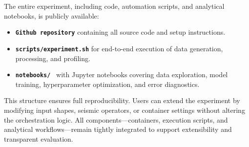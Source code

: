 
The entire experiment, including code, automation scripts, and analytical notebooks, is publicly available:
\begin{itemize}
    \item \textbf{\texttt{Github repository}}\cite{delucca2025experiment2} containing all source code and setup instructions.
    \item \textbf{\texttt{scripts/experiment.sh}}\cite{delucca2025experiment2script} for end-to-end execution of data generation, processing, and profiling.
    \item \textbf{\texttt{notebooks/}}~\cite{delucca2025experiment2notebooks} with Jupyter notebooks covering data exploration, model training, hyperparameter optimization, and error diagnostics.
\end{itemize}

This structure ensures full reproducibility.
Users can extend the experiment by modifying input shapes, seismic operators, or container settings without altering the orchestration logic.
All components—containers, execution scripts, and analytical workflows—remain tightly integrated to support extensibility and transparent evaluation.